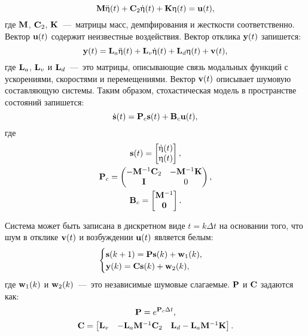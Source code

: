 \begin{equation}
	\mathbf{M} \ddot{\mathbf{\upeta}}(t) + \mathbf{C}_2 \dot{\mathbf{\upeta}}(t) + \mathbf{K} \upeta(t) = \mathbf{u}(t),
\end{equation}
где $ \mathbf{M} $, $ \mathbf{C}_2 $, $ \mathbf{K} $~---~матрицы масс, демпфирования и жесткости соответственно. Вектор $ \mathbf{u}(t) $ содержит неизвестные воздействия. Вектор отклика $ \mathbf{y}(t) $ запишется:
\begin{equation}
	\mathbf{y}(t) = \mathbf{L}_a \ddot{\mathbf{\upeta}}(t) + \mathbf{L}_v \dot{\mathbf{\upeta}}(t) + \mathbf{L}_d \upeta(t) + \mathbf{v}(t),
\end{equation}
где $ \mathbf{L}_a $, $ \mathbf{L}_v $ и $ \mathbf{L}_d $~---~это матрицы, описывающие связь модальных функций с ускорениями, скоростями и перемещениями. Вектор $ \mathbf{v}(t) $ описывает шумовую составляющую системы. Таким образом, стохастическая модель в пространстве состояний запишется:
\begin{equation}
	\dot{\mathbf{s}}(t) = \mathbf{P}_c \mathbf{s}(t) + \mathbf{B}_c \mathbf{u}(t), \label{eq:stochasticModelSSI}
\end{equation}
где 
\begin{gather}
	\mathbf{s}(t) = 
	\begin{bmatrix} 
		\dot{\mathbf{\upeta}}(t) \\ 
		\mathbf{\upeta}(t) 
	\end{bmatrix}, \\
	\mathbf{P}_c =
	\begin{pmatrix}
		-\mathbf{M} ^ {-1} \mathbf{C}_2 & -\mathbf{M} ^ {-1} \mathbf{K} \\
		 \mathbf{I} & 0
	\end{pmatrix}, \\
	\mathbf{B}_c = 
	\begin{bmatrix}
		\mathbf{M} ^ {-1} \\
		\mathbf{0}	
	\end{bmatrix}.
\end{gather}

Система может быть записана в дискретном виде $ t = k \Delta t $ на основании того, что шум в отклике $ \mathbf{v}(t) $ и возбуждении $ \mathbf{u}(t) $ является белым:
\begin{equation}
	\begin{cases}
		\mathbf{s}(k + 1) = \mathbf{P} \mathbf{s}(k) + \mathbf{w}_1(k), \\
		\mathbf{y}(k) = \mathbf{C} \mathbf{s}(k) + \mathbf{w}_2(k),
	\end{cases}
\end{equation}
где $ \mathbf{w}_1(k) $ и $ \mathbf{w}_2(k) $~---~это независимые шумовые слагаемые. $ \mathbf{P} $ и $ \mathbf{C} $ задаются как:
\begin{gather}
	\mathbf{P} = e ^ {\mathbf{P}_c \Delta t}, \\
	\mathbf{C} = 
	\begin{bmatrix} 
		\mathbf{L}_v & -\mathbf{L}_a \mathbf{M} ^ {-1} \mathbf{C}_2 & \mathbf{L}_d - \mathbf{L}_a \mathbf{M} ^ {-1} \mathbf{K}
	\end{bmatrix}.
\end{gather}

